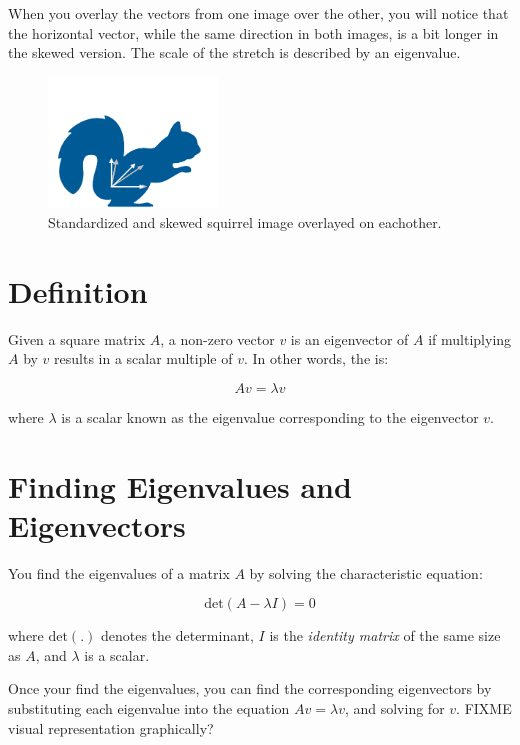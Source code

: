 When you overlay the vectors from one image over the other, you will notice that the horizontal vector, while the same direction in both images, is a bit longer in the skewed version. The scale of the stretch is described by an eigenvalue.
\begin{figure}[htbp]
    \centering
    \includegraphics[width=0.4\textwidth]{overlaysquirrel.png}
    \caption{Standardized and skewed squirrel image overlayed on eachother.}
    \label{fig:overlaysquirrel}
\end{figure}


\section{Definition}

Given a square matrix $A$, a non-zero vector $v$ is an eigenvector of
$A$ if multiplying $A$ by $v$ results in a scalar multiple of $v$. In other words, the  is:

\begin{equation}
Av = \lambda v
\end{equation}

where $\lambda$ is a scalar known as the eigenvalue corresponding to the eigenvector $v$.

\section{Finding Eigenvalues and Eigenvectors}
You find the eigenvalues of a matrix $A$  by solving the characteristic equation:

\begin{equation}
\text{det}(A - \lambda I) = 0
\end{equation}

where $\text{det}(.)$ denotes the determinant, $I$ is the \emph{identity
matrix} of the same size as $A$, and $\lambda$ is a scalar.

Once your find the eigenvalues, you can find the corresponding eigenvectors by substituting each eigenvalue into the equation $Av = \lambda
v$, and solving for $v$.
FIXME visual representation graphically?
